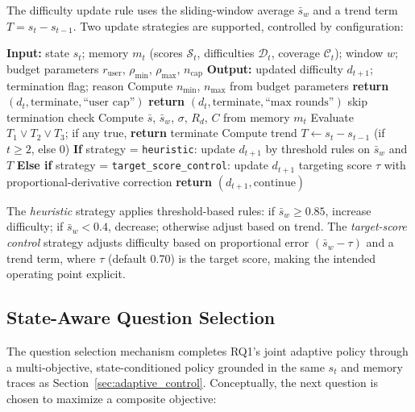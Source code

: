 ﻿\documentclass[final,3p,times,authoryear]{elsarticle}
\begin{document}
\noindent The difficulty update rule uses the sliding-window average $\bar{s}_w$ and a trend term $T = s_t - s_{t-1}$. Two update strategies are supported, controlled by configuration:

\begin{algorithm}[h]
\caption{Adaptive Control: Difficulty Update and Termination}
\label{alg:rq1}
\begin{algorithmic}[1]
\STATE \textbf{Input:} state $s_t$; memory $m_t$ (scores $\mathcal{S}_t$, difficulties $\mathcal{D}_t$, coverage $\mathcal{C}_t$); window $w$; budget parameters $r_{\text{user}}$, $\rho_{\min}$, $\rho_{\max}$, $n_{\text{cap}}$
\STATE \textbf{Output:} updated difficulty $d_{t+1}$; termination flag; reason
\STATE Compute $n_{\min}$, $n_{\max}$ from budget parameters
 \STATE \textbf{return} $(d_t, \text{terminate}, \text{``user cap''})$ \ENDIF
{} \STATE \textbf{return} $(d_t, \text{terminate}, \text{``max rounds''})$ \ENDIF
{} \STATE skip termination check \ENDIF
\STATE Compute $\bar{s}$, $\bar{s}_w$, $\sigma$, $R_d$, $C$ from memory $m_t$
\STATE Evaluate $T_1 \lor T_2 \lor T_3$; if any true, \textbf{return} terminate
\STATE Compute trend $T \leftarrow s_t - s_{t-1}$ (if $t \ge 2$, else $0$)
\STATE \textbf{If} strategy = \texttt{heuristic}: update $d_{t+1}$ by threshold rules on $\bar{s}_w$ and $T$
\STATE \textbf{Else if} strategy = \texttt{target\_score\_control}: update $d_{t+1}$ targeting score $\tau$ with proportional-derivative correction
\STATE \textbf{return} $(d_{t+1}, \text{continue})$
\end{algorithmic}
\end{algorithm}

The \emph{heuristic} strategy applies threshold-based rules: if $\bar{s}_w \geq 0.85$, increase difficulty; if $\bar{s}_w < 0.4$, decrease; otherwise adjust based on trend. The \emph{target-score control} strategy adjusts difficulty based on proportional error $(\bar{s}_w - \tau)$ and a trend term, where $\tau$ (default 0.70) is the target score, making the intended operating point explicit.

\subsection{State-Aware Question Selection}
\label{sec:selection}

\noindent The question selection mechanism completes RQ1's joint adaptive policy through a multi-objective, state-conditioned policy grounded in the same $s_t$ and memory traces as Section~\ref{sec:adaptive_control}. Conceptually, the next question is chosen to maximize a composite objective:
\end{document}
